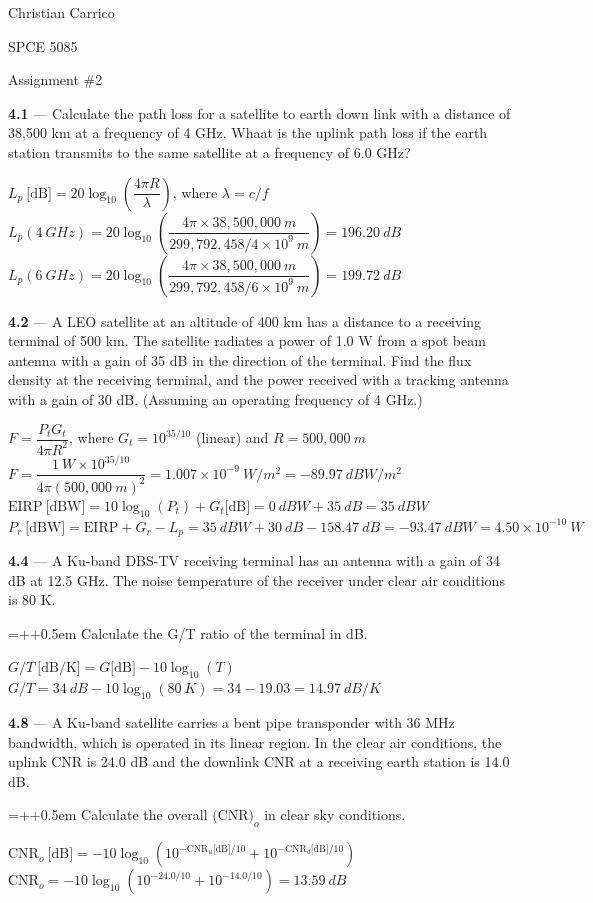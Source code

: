 \documentclass[12pt]{article}
\newcommand{\ans}[1]{\boxed{#1}}
\newlength{\subproblemindent}
\newlength{\subproblemlabelwidth}
\newlength{\solutionindent}
\newcommand{\problem}[2]{\vspace{1em}\noindent\textbf{#1} --- #2\par\vspace{0.25em}}
\newcommand{\subproblem}[2]{%
  \par\vspace{0.5em}%
  \noindent
  \hangindent=\dimexpr\subproblemindent+\subproblemlabelwidth+0.5em\relax
  \hangafter=1
  \hspace*{\subproblemindent}%
  \makebox[\subproblemlabelwidth][l]{\textbf{#1}}#2\par
}
\newcommand{\solution}[1]{%
  \par\vspace{0.0em}%
  \begin{list}{}{
    \setlength{\leftmargin}{\solutionindent}
    \setlength{\rightmargin}{0pt}
    \setlength{\listparindent}{0pt}
    \setlength{\itemindent}{0pt}
    \setlength{\parsep}{0pt}
  }%
    \item\relax
    \begingroup
      \setlength{\baselineskip}{1.5\baselineskip}
      \setlength{\lineskip}{1.5\lineskip}
      \setlength{\parskip}{0pt}
      \everymath{\displaystyle}
      #1
      \par
    \endgroup
  \end{list}%
  \vspace{0.25em}%
}
\begin{document}
\hfill Christian Carrico

\hfill SPCE 5085

\hfill Assignment \#2

\problem{4.1}{Calculate the path loss for a satellite to earth down link with a distance of 38,500 km at a frequency of 4 GHz. Whaat is the uplink path loss if the earth station transmits to the same satellite at a frequency of 6.0 GHz?}
\solution{
$L_p\ \text{[dB]} = 20\log_{10}\left(\dfrac{4\pi R}{\lambda}\right)$, where $\lambda = c/f$ \\
$L_p(4\ GHz) = 20\log_{10}\left(\dfrac{4\pi \times 38{,}500{,}000\ m}{299{,}792{,}458/4\times10^9\ m}\right) = \ans{196.20\ dB}$ \\
$L_p(6\ GHz) = 20\log_{10}\left(\dfrac{4\pi \times 38{,}500{,}000\ m}{299{,}792{,}458/6\times10^9\ m}\right) = \ans{199.72\ dB}$
}
\problem{4.2}{A LEO satellite at an altitude of 400 km has a distance to a receiving terminal of 500 km. The satellite radiates a power of 1.0 W from a spot beam antenna with a gain of 35 dB in the direction of the terminal. Find the flux density at the receiving terminal, and the power received with a tracking antenna with a gain of 30 dB. (Assuming an operating frequency of 4 GHz.)}
\solution{
$F = \dfrac{P_t G_t}{4\pi R^2}$, where $G_t = 10^{35/10}$ (linear) and $R = 500{,}000\ m$ \\
$F = \dfrac{1\ W \times 10^{35/10}}{4\pi (500{,}000\ m)^2} = 1.007\times10^{-9}\ W/m^2 = \ans{-89.97\ dBW/m^2}$ \\
$\text{EIRP}\ \text{[dBW]} = 10\log_{10}(P_t) + G_t\text{[dB]} = 0\ dBW + 35\ dB = 35\ dBW$ \\
$P_r\ \text{[dBW]} = \text{EIRP} + G_r - L_p = 35\ dBW + 30\ dB - 158.47\ dB = \ans{-93.47\ dBW = 4.50\times10^{-10}\ W}$
}
\problem{4.4}{A Ku-band DBS-TV receiving terminal has an antenna with a gain of 34 dB at 12.5 GHz. The noise temperature of the receiver under clear air conditions is 80 K.}
\subproblem{a}{Calculate the G/T ratio of the terminal in dB.}
\solution{
$G/T\ \text{[dB/K]} = G\text{[dB]} - 10\log_{10}(T)$ \\
$G/T = 34\ dB - 10\log_{10}(80\ K) = 34 - 19.03 = \ans{14.97\ dB/K}$
}
\problem{4.8}{A Ku-band satellite carries a bent pipe transponder with 36 MHz bandwidth, which is operated in its linear region. In the clear air conditions, the uplink CNR is 24.0 dB and the downlink CNR at a receiving earth station is 14.0 dB.}
\subproblem{a}{Calculate the overall $\text{(CNR)}_o$ in clear sky conditions.}
\solution{
$\text{CNR}_o\ \text{[dB]} = -10\log_{10}\left(10^{-\text{CNR}_u\text{[dB]}/10} + 10^{-\text{CNR}_d\text{[dB]}/10}\right)$ \\
$\text{CNR}_o = -10\log_{10}\left(10^{-24.0/10} + 10^{-14.0/10}\right) = \ans{13.59\ dB}$
}
\end{document}
